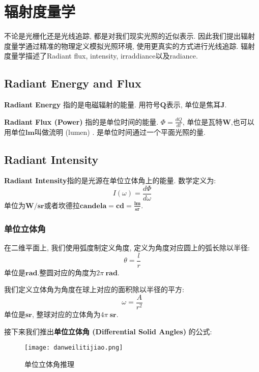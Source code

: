 \chapter{辐射度量学}
不论是光栅化还是光线追踪, 都是对我们现实光照的近似表示. 因此我们提出辐射度量学通过精准的物理定义模拟光照环境, 使用更真实的方式进行光线追踪. 辐射度量学描述了Radiant flux, intensity, irraddiance以及radiance. 

\section{Radiant Energy and Flux}
\textbf{Radiant Energy} 指的是电磁辐射的能量. 用符号$\mathbf{Q}$表示, 单位是焦耳$\mathbf{J}$.

\textbf{Radiant Flux (Power) } 指的是单位时间的能量. $\Phi=\frac{dQ}{dt}$, 单位是瓦特$\mathbf{W}$,也可以用单位$\mathbf{lm}$叫做流明 (lumen) . 是单位时间通过一个平面光照的量. 

\section{Radiant Intensity}
\textbf{Radiant Intensity}指的是光源在单位立体角上的能量. 数学定义为: 
\begin{equation}
	I(\omega)=\frac{d\Phi}{d\omega}
\end{equation} 单位为$\mathbf{W}/\mathbf{sr}$或者坎德拉$\mathbf{candela}=\mathbf{cd}=\frac{\mathbf{lm}}{\mathbf{sr}}$.

\subsection{单位立体角}
在二维平面上, 我们使用弧度制定义角度, 定义为角度对应圆上的弧长除以半径: 
\begin{equation}
	\theta = \frac{l}{r}
\end{equation} 单位是$\mathbf{rad}$.整圆对应的角度为$2\pi\ \mathbf{rad}$.

我们定义立体角为角度在球上对应的面积除以半径的平方: 
\begin{equation}
	\omega=\frac{A}{r^2}
\end{equation} 单位是$\mathbf{sr}$, 整球对应的立体角为$4\pi\ \mathbf{sr}$.

接下来我们推出\textbf{单位立体角 (Differential Solid Angles) }的公式: 
\begin{figure}[H]
	\centering
	\texttt{[image: danweilitijiao.png]}
	\caption{单位立体角推理}
	\label{fig:dwltj}
\end{figure}

